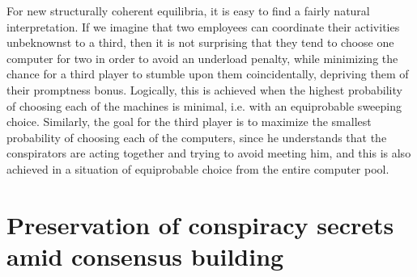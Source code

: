For new structurally coherent equilibria, it is easy to find a fairly natural interpretation. If we imagine that two employees can coordinate their activities unbeknownst to a third, then it is not surprising that they tend to choose one computer for two in order to avoid an underload penalty, while minimizing the chance for a third player to stumble upon them coincidentally, depriving them of their promptness bonus. Logically, this is achieved when the highest probability of choosing each of the machines is minimal, i.e. with an equiprobable sweeping choice. Similarly, the goal for the third player is to maximize the smallest probability of choosing each of the computers, since he understands that the conspirators are acting together and trying to avoid meeting him, and this is also achieved in a situation of equiprobable choice from the entire computer pool. %

\section{Preservation of conspiracy secrets amid consensus building}\label{sec:ch2/sec6}

